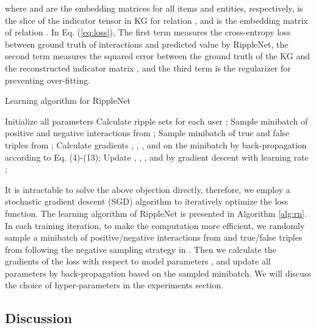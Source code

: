 \documentclass[sigconf]{acmart}
\begin{document}
		where  and  are the embedding matrices for all items and entities, respectively,  is the slice of the indicator tensor  in KG for relation , and  is the embedding matrix of relation .
		In Eq. (\ref{eq:loss}), The first term measures the cross-entropy loss between ground truth of interactions  and predicted value by RippleNet, the second term measures the squared error between the ground truth of the KG  and the reconstructed indicator matrix , and the third term is the regularizer for preventing over-fitting.
		
		\begin{algorithm}[t]
			\caption{Learning algorithm for RippleNet}
			\label{alg:rn}
			\begin{algorithmic}[1]
				\STATE Initialize all parameters
				\STATE Calculate ripple sets  for each user ;
				\STATE Sample minibatch of positive and negative interactions from ;
				\STATE Sample minibatch of true and false triples from ;
				\STATE Calculate gradients , , , and  on the minibatch by back-propagation according to Eq. (4)-(13);
				\STATE Update , , , and  by gradient descent with learning rate ;
				\ENDFOR
				\RETURN 
			\end{algorithmic}
		\end{algorithm}
		
		It is intractable to solve the above objection directly, therefore, we employ a stochastic gradient descent (SGD) algorithm to iteratively optimize the loss function.
		The learning algorithm of RippleNet is presented in Algorithm \ref{alg:rn}.
		In each training iteration, to make the computation more efficient, we randomly sample a minibatch of positive/negative interactions from  and true/false triples from  following the negative sampling strategy in \cite{mikolov2013distributed}.
		Then we calculate the gradients of the loss  with respect to model parameters , and update all parameters by back-propagation based on the sampled minibatch.
		We will discuss the choice of hyper-parameters in the experiments section.
		
		
	\subsection{Discussion}
\end{document}
